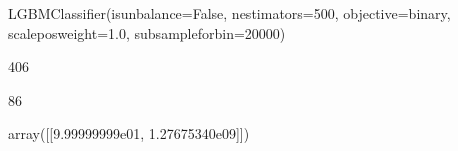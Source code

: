 \documentclass[letterpaper,10pt,english]{jupyterBook}
\begin{document}
\begin{sphinxVerbatim}[commandchars=\\\{\}]
LGBMClassifier(is\PYGZus{}unbalance=False, n\PYGZus{}estimators=500, objective=\PYGZsq{}binary\PYGZsq{},
               scale\PYGZus{}pos\PYGZus{}weight=1.0, subsample\PYGZus{}for\PYGZus{}bin=20000)
\end{sphinxVerbatim}

\begin{sphinxVerbatim}[commandchars=\\\{\}]
\PYG{p}{[}\PYG{p}{]} \PYG{p}{[}\PYG{p}{]}
\end{sphinxVerbatim}

\begin{sphinxVerbatim}[commandchars=\\\{\}]
406
\end{sphinxVerbatim}

\begin{sphinxVerbatim}[commandchars=\\\{\}]
86
\end{sphinxVerbatim}

\begin{sphinxVerbatim}[commandchars=\\\{\}]
\PYG{p}{[}\PYG{p}{]}  \PYG{p}{[}\PYG{p}{]}
\end{sphinxVerbatim}

\begin{sphinxVerbatim}[commandchars=\\\{\}]
array([[9.99999999e\PYGZhy{}01, 1.27675340e\PYGZhy{}09]])
\end{sphinxVerbatim}
\end{document}
